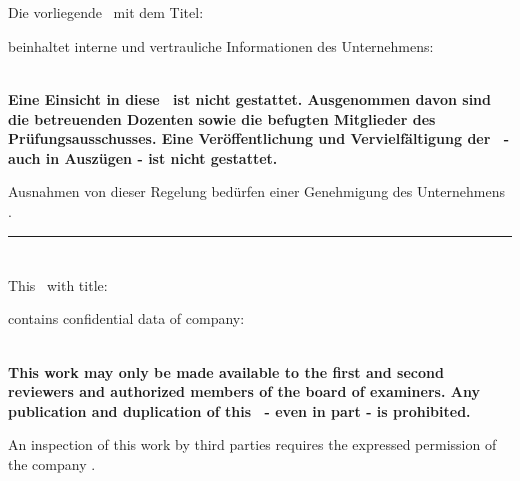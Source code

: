 
\section*{}

Die vorliegende \thesistype \ mit dem Titel:
\begin{center}
	\textit{\thesistitle}
\end{center}
beinhaltet interne und vertrauliche Informationen des Unternehmens:
\begin{center}
	\textit{\companyname}
\end{center}

\textbf{\\
Eine Einsicht in diese \thesistype \ ist nicht gestattet. Ausgenommen davon sind die betreuenden Dozenten sowie die befugten Mitglieder des Prüfungsausschusses. Eine Veröffentlichung und Vervielfältigung der \thesistype \ - auch in Auszügen - ist nicht gestattet.
}

Ausnahmen von dieser Regelung bedürfen einer Genehmigung des Unternehmens \textit{\companyname}.

\rule{\textwidth}{0.4pt}


\section*{}

This \thesistypeenglish \ with title:
\begin{center}
	\textit{\thesistitle}
\end{center}
contains confidential data of company:
\begin{center}
	\textit{\companyname}
\end{center}

\textbf{\\
This work may only be made available to the first and second reviewers and authorized members of the board of examiners. Any publication and duplication of this \thesistypeenglish \ - even in part - is prohibited.
}

An inspection of this work by third parties requires the expressed permission of the company \textit{\companyname}.


\newpage